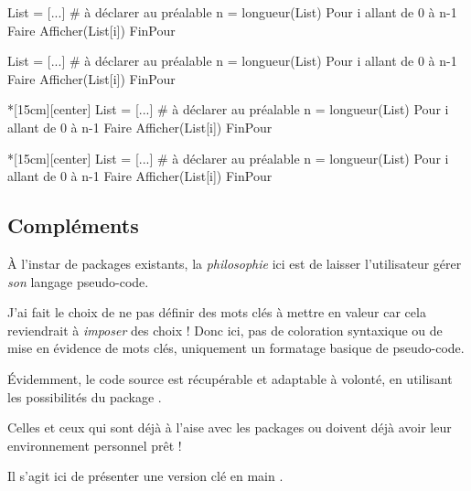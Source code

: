 \documentclass{article}
\newcommand\ctex[1]{\tcbox[vignettelatex]{#1}}
\begin{document}
\begin{codetex}
\begin{envpseudocode} %
List = [...]          # à déclarer au préalable
n = longueur(List)
Pour i allant de 0 à n-1 Faire
	Afficher(List[i])
FinPour
\end{envpseudocode}
\end{codetex}

\begin{codesortie}
\begin{envpseudocode}
List = [...]          # à déclarer au préalable
n = longueur(List)
Pour i allant de 0 à n-1 Faire
	Afficher(List[i])
FinPour
\end{envpseudocode}
\end{codesortie}

\begin{codetex}
\begin{envpseudocode}*[15cm][center] %
List = [...]          # à déclarer au préalable
n = longueur(List)
Pour i allant de 0 à n-1 Faire
	Afficher(List[i])
FinPour
\end{envpseudocode}
\end{codetex}

\begin{codesortie}
\begin{envpseudocode}*[15cm][center]
List = [...]          # à déclarer au préalable
n = longueur(List)
Pour i allant de 0 à n-1 Faire
	Afficher(List[i])
FinPour
\end{envpseudocode}
\end{codesortie}

\subsection{Compléments}

\begin{codeinfo}
À l'instar de packages existants, la \textit{philosophie} ici est de laisser l'utilisateur gérer \textit{son} langage pseudo-code.

J'ai fait le choix de ne pas définir des \textsf{mots clés} à mettre en valeur car cela reviendrait à \textit{imposer} des choix ! Donc ici, pas de coloration syntaxique ou de mise en évidence de mots clés, uniquement un formatage basique de pseudo-code.
\end{codeinfo}

\begin{codeidee}
Évidemment, le code source est récupérable et adaptable à volonté, en utilisant les possibilités du package \ctex{listings}.

\smallskip

Celles et ceux qui sont déjà à l'aise avec les packages \ctex{listings} ou \ctex{minted} doivent déjà avoir leur environnement personnel prêt ! 

Il s'agit ici de présenter une version \og clé en main \fg{}.
\end{codeidee}
\end{document}
